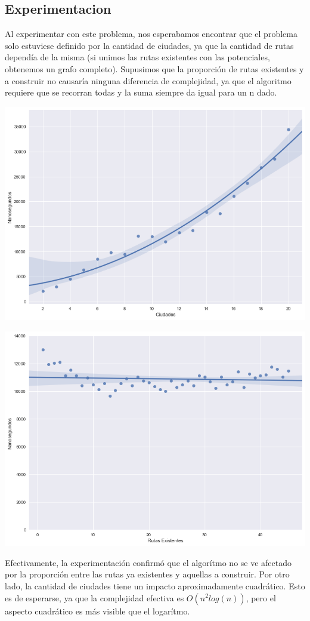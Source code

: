 \subsection{Experimentacion}

Al experimentar con este problema, nos esperabamos encontrar que el problema solo estuviese definido por la cantidad de ciudades, ya que la cantidad de rutas dependía de la misma (si unimos las rutas existentes con las potenciales, obtenemos un grafo completo). Supusimos que la proporción de rutas existentes y a construir no causaría ninguna diferencia de complejidad, ya que el algoritmo requiere que se recorran todas y la suma siempre da igual para un n dado.

\begin{center}
	\includegraphics[scale=0.5]{imagenes/ej3-1.png}

	\includegraphics[scale=0.5]{imagenes/ej3-2.png}
\end{center}

Efectivamente, la experimentación confirmó que el algorítmo no se ve afectado por la proporción entre las rutas ya existentes y aquellas a construir. Por otro lado, la cantidad de ciudades tiene un impacto aproximadamente cuadrático. Esto es de esperarse, ya que la complejidad efectiva es $O(n^2log(n))$, pero el aspecto cuadrático es más visible que el logarítmo.
